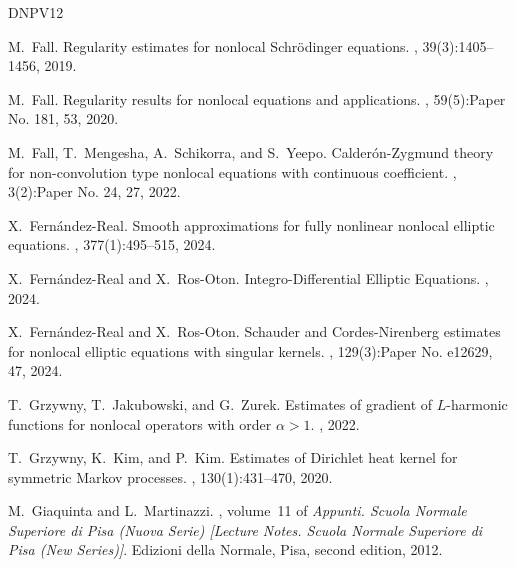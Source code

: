 \documentclass[11pt,reqno]{amsart}
\theoremstyle{plain}
\theoremstyle{definition}
\numberwithin{equation}{section}
\newcommand{\1}{\mathbbm{1}}
\begin{document}
\begin{thebibliography}{DNPV12}

M.~Fall.
\newblock Regularity estimates for nonlocal {S}chr\"odinger equations.
, 39(3):1405--1456, 2019.

M.~Fall.
\newblock Regularity results for nonlocal equations and applications.
, 59(5):Paper No. 181,
  53, 2020.

M.~Fall, T.~Mengesha, A.~Schikorra, and S.~Yeepo.
\newblock Calder\'on-{Z}ygmund theory for non-convolution type nonlocal
  equations with continuous coefficient.
, 3(2):Paper No. 24, 27, 2022.

X.~Fern\'andez-Real.
\newblock Smooth approximations for fully nonlinear nonlocal elliptic
  equations.
, 377(1):495--515, 2024.

X.~Fern{\'a}ndez-Real and X.~Ros-Oton.
\newblock Integro-{D}ifferential {E}lliptic {E}quations.
, 2024.

X.~Fern{\'a}ndez-Real and X.~Ros-Oton.
\newblock Schauder and {C}ordes-{N}irenberg estimates for nonlocal elliptic
  equations with singular kernels.
, 129(3):Paper No. e12629, 47, 2024.

T.~Grzywny, T.~Jakubowski, and G.~Zurek.
\newblock Estimates of gradient of {$L$}-harmonic functions for nonlocal
  operators with order $\alpha > 1$.
, 2022.

T.~Grzywny, K.~Kim, and P.~Kim.
\newblock Estimates of {D}irichlet heat kernel for symmetric {M}arkov
  processes.
, 130(1):431--470, 2020.

M.~Giaquinta and L.~Martinazzi.
, volume~11 of {\em Appunti. Scuola Normale
  Superiore di Pisa (Nuova Serie) [Lecture Notes. Scuola Normale Superiore di
  Pisa (New Series)]}.
\newblock Edizioni della Normale, Pisa, second edition, 2012.


\end{thebibliography}
\end{document}
